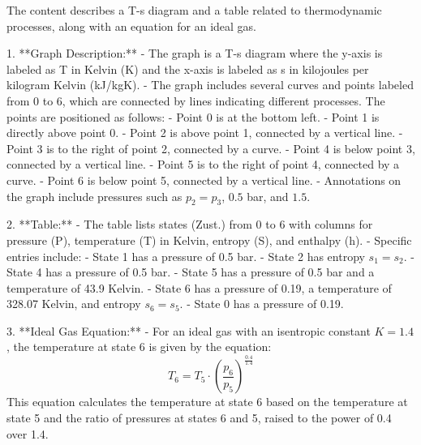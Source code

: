The content describes a T-s diagram and a table related to thermodynamic processes, along with an equation for an ideal gas.

1. **Graph Description:**
   - The graph is a T-s diagram where the y-axis is labeled as T in Kelvin (K) and the x-axis is labeled as s in kilojoules per kilogram Kelvin (kJ/kgK).
   - The graph includes several curves and points labeled from 0 to 6, which are connected by lines indicating different processes. The points are positioned as follows:
     - Point 0 is at the bottom left.
     - Point 1 is directly above point 0.
     - Point 2 is above point 1, connected by a vertical line.
     - Point 3 is to the right of point 2, connected by a curve.
     - Point 4 is below point 3, connected by a vertical line.
     - Point 5 is to the right of point 4, connected by a curve.
     - Point 6 is below point 5, connected by a vertical line.
   - Annotations on the graph include pressures such as \( p_2 = p_3 \), \( 0.5 \) bar, and \( 1.5 \).

2. **Table:**
   - The table lists states (Zust.) from 0 to 6 with columns for pressure (P), temperature (T) in Kelvin, entropy (S), and enthalpy (h).
   - Specific entries include:
     - State 1 has a pressure of 0.5 bar.
     - State 2 has entropy \( s_1 = s_2 \).
     - State 4 has a pressure of 0.5 bar.
     - State 5 has a pressure of 0.5 bar and a temperature of 43.9 Kelvin.
     - State 6 has a pressure of 0.19, a temperature of 328.07 Kelvin, and entropy \( s_6 = s_5 \).
     - State 0 has a pressure of 0.19.

3. **Ideal Gas Equation:**
   - For an ideal gas with an isentropic constant \( K = 1.4 \), the temperature at state 6 is given by the equation:
   \[
   T_6 = T_5 \cdot \left( \frac{p_6}{p_5} \right)^{\frac{0.4}{1.4}}
   \]
   This equation calculates the temperature at state 6 based on the temperature at state 5 and the ratio of pressures at states 6 and 5, raised to the power of 0.4 over 1.4.